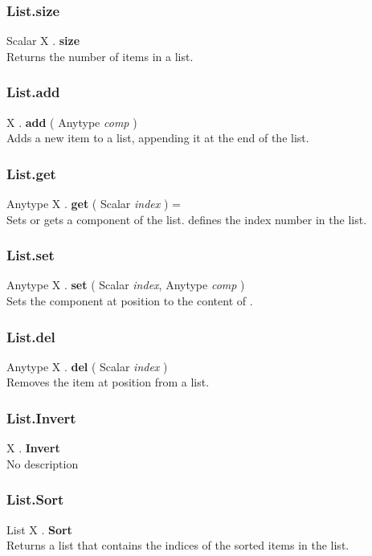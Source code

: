 \subsubsection{List.size \label{F:List:size}}
Scalar X . \textbf{size} \\
Returns the number of items in a list.

\subsubsection{List.add \label{F:List:add}}
X . \textbf{add} ( Anytype \textit{comp} ) \\
Adds a new item to a list, appending it at the end of the list.

\subsubsection{List.get \label{F:List:get}}
Anytype X . \textbf{get} ( Scalar \textit{index} ) = \\
Sets or gets a component of the list.  defines the index number in the list.

\subsubsection{List.set \label{F:List:set}}
Anytype X . \textbf{set} ( Scalar \textit{index}, Anytype \textit{comp} ) \\
Sets the component at position  to the content of .

\subsubsection{List.del \label{F:List:del}}
Anytype X . \textbf{del} ( Scalar \textit{index} ) \\
Removes the item at position  from a list.

\subsubsection{List.Invert \label{F:List:Invert}}
X . \textbf{Invert} \\
No description

\subsubsection{List.Sort \label{F:List:Sort}}
List X . \textbf{Sort} \\
Returns a list that contains the indices of the sorted items in the list.

